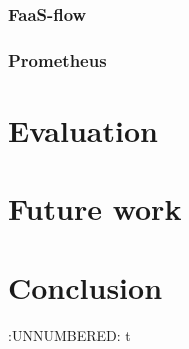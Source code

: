 \documentclass[12pt,titlepage]{article}
\begin{document}
\subsubsection{FaaS-flow}
\label{sec:org996eb1a}
\subsubsection{Prometheus}
\label{sec:org02dd5c3}
\section{Evaluation}
\label{sec:org64e4cfa}
\section{Future work}
\label{sec:org2aeb68d}
\section{Conclusion}
\label{sec:org248e0e3}


:UNNUMBERED: t
\end{document}
